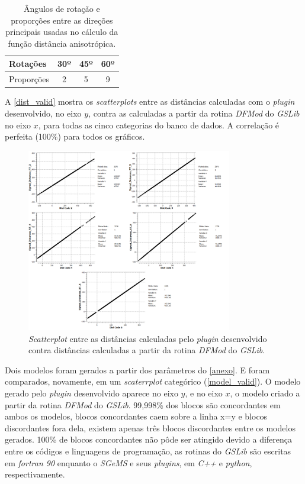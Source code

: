 \begin{table}[!ht]
\centering
\caption{Ângulos de rotação e proporções entre as direções principais usadas no cálculo da função distância anisotrópica.}
\label{valid_rot}
\begin{tabular}{lccc}

Rotações   & 30º & 45º & 60º \\ \hline
Proporções & 2  & 5  & 9  \\ 
\end{tabular}
\end{table}

A \autoref{dist_valid} mostra os \textit{scatterplots} entre as distâncias calculadas com o \textit{plugin} desenvolvido, no eixo $y$, contra as calculadas a partir da rotina \textit{DFMod} do \textit{GSLib} no eixo $x$, para todas as cinco categorias do banco de dados. A correlação é perfeita (100\%) para todos os gráficos.

\begin{figure}[H]
	\caption{\label{dist_valid}\textit{Scatterplot} entre as distâncias calculadas pelo \textit{plugin} desenvolvido contra distâncias calculadas a partir da rotina \textit{DFMod} do \textit{GSLib}.}
	\begin{center}
		\includegraphics[width=0.8\textwidth]{modelagem_geologica/distances_valid}
	\end{center}
\end{figure}

Dois modelos foram gerados a partir dos  parâmetros do \autoref{anexo}. E foram comparados, novamente, em um \textit{scaterrplot} categórico (\autoref{model_valid}). O modelo gerado pelo \textit{plugin} desenvolvido aparece no eixo $y$, e no eixo $x$, o modelo criado a partir da rotina \textit{DFMod} do \textit{GSLib}. 99,998\% dos blocos são concordantes em ambos os modelos, blocos concordantes caem sobre a linha x=y e blocos discordantes fora dela, existem apenas três blocos discordantes entre os modelos gerados. 100\% de blocos concordantes não pôde ser atingido devido a diferença entre os códigos e linguagens de programação, as rotinas do \textit{GSLib} são escritas em \textit{fortran 90} enquanto o \textit{SGeMS} e seus \textit{plugins}, em \textit{C++} e \textit{python}, respectivamente.

